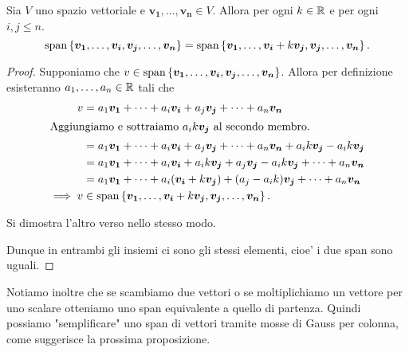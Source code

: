 \begin{proposition} \label{span_Gauss}
    Sia $V$ uno spazio vettoriale e $\bm{v_1}, \dots, \bm{v_n} \in V$. Allora per ogni $k \in \mathbb{R}$ e per ogni $i, j \leq n$.
    \begin{equation}
        \operatorname{span}\left\{\bm{v_1}, \dots, \bm{v_i}, \bm{v_j}, \dots, \bm{v_n}\right\} = \operatorname{span}\left\{\bm{v_1}, \dots, \bm{v_i} + k\bm{v_j}, \bm{v_j}, \dots, \bm{v_n}\right\}.
    \end{equation}
\end{proposition}
\begin{proof}
    Supponiamo che $v \in \operatorname{span}\left\{\bm{v_1}, \dots, \bm{v_i}, \bm{v_j}, \dots, \bm{v_n}\right\}$. Allora per definizione esisteranno $a_1, \dots, a_n \in \mathbb{R}$ tali che
    \begin{alignat*}{1}
        v &= a_1\bm{v_1} + \dots + a_i\bm{v_i} + a_j\bm{v_j} + \dots + a_n\bm{v_n} \\
        \intertext{Aggiungiamo e sottraiamo $a_ik\bm{v_j}$ al secondo membro.}
        &= a_1\bm{v_1} + \dots + a_i\bm{v_i} + a_j\bm{v_j} + \dots + a_n\bm{v_n} + a_ik\bm{v_j} - a_ik\bm{v_j}\\
        &= a_1\bm{v_1} + \dots + a_i\bm{v_i} + a_ik\bm{v_j} + a_j\bm{v_j} - a_ik\bm{v_j} + \dots + a_n\bm{v_n}\\
        &= a_1\bm{v_1} + \dots + a_i(\bm{v_i} + k\bm{v_j}) + (a_j - a_ik)\bm{v_j} + \dots + a_n\bm{v_n}\\
        \implies v &\in \operatorname{span}\left\{\bm{v_1}, \dots, \bm{v_i} + k\bm{v_j}, \bm{v_j}, \dots, \bm{v_n}\right\}. 
    \end{alignat*}

    Si dimostra l'altro verso nello stesso modo.

    Dunque in entrambi gli insiemi ci sono gli stessi elementi, cioe' i due span sono uguali.
\end{proof}

Notiamo inoltre che se scambiamo due vettori o se moltiplichiamo un vettore per uno scalare otteniamo uno span equivalente a quello di partenza. Quindi possiamo "semplificare" uno span di vettori tramite mosse di Gauss per colonna, come suggerisce la prossima proposizione.

